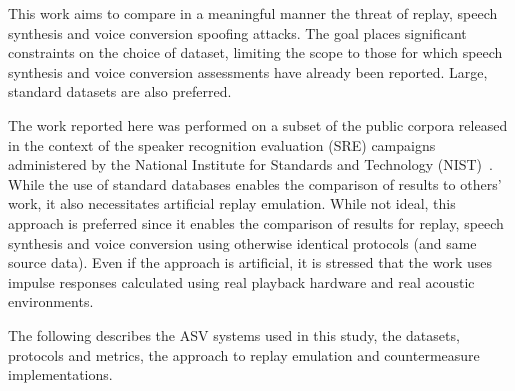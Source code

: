 

This work aims to compare in a meaningful manner the threat of replay, speech synthesis and voice conversion spoofing attacks.  The goal places significant constraints on the choice of dataset, limiting the scope to those for which speech synthesis and voice conversion assessments have already been reported.  Large, standard datasets are also preferred.  

The work reported here was performed on a subset of the public corpora released in the context of the speaker recognition evaluation (SRE) campaigns administered by the National Institute for Standards and Technology (NIST)~\cite{ref to an evaluation plan for e.g. '08 data or just the web address to the NIST SRE evaluations}.  While the use of standard databases enables the comparison of results to others' work, it also necessitates artificial replay emulation.  While not ideal, this approach is preferred since it enables the comparison of results for replay, speech synthesis and voice conversion using otherwise identical protocols (and same source data).  Even if the approach is artificial, it is stressed that the work uses impulse responses calculated using real playback hardware and real acoustic environments.



The following describes the ASV systems used in this study, the datasets, protocols and metrics, the approach to replay emulation and countermeasure implementations.
